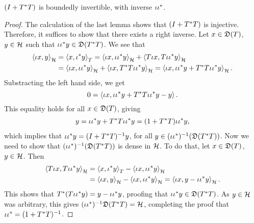 \begin{prop}
 $(I + T ^{*} T)$ is boundedly
 invertible, with inverse $\iota \iota ^{*}$.
\end{prop}
\begin{proof}
  The calculation of the last lemma shows that $(I + T ^{*} T)$ is injective.
  Therefore, it suffices to show that there exists a right inverse.
  Let $x \in \mathfrak{D}(T)$, $y \in \mathcal{H}$ such that 
  $\iota  \iota ^{*} y \in \mathfrak{D}(T^{*} T)$.
  We see that
  \begin{align*}
\left\langle \iota x, y \right\rangle_{\mathcal{H}} &= \left\langle x, \iota ^{*} y \right\rangle_T = 
  \left\langle \iota x,\iota \iota ^{*} y \right\rangle_{\mathcal{H}} +
  \left\langle  T \iota x, T \iota \iota ^{*} y \right\rangle_{\mathcal{H}} \\
  &=\left\langle \iota x, \iota \iota ^{*} y \right\rangle_{\mathcal{H}}  +
  \left\langle \iota x , T ^{*} T \iota \iota ^{*} y \right\rangle_{\mathcal{H}}  =
  \left\langle \iota x, \iota \iota ^{*} y + T^{*} T \iota \iota ^{*} y \right\rangle_{\mathcal{H}} .
  \end{align*}
    Substracting the left hand side, we get
  \[
   0 = \left\langle \iota x , \iota \iota ^{*} y + T^{*} T \iota \iota ^{*} y - y \right\rangle.
  \]
This equality holds for all $x \in \mathfrak{D}(T)$, giving
  \begin{align*}
  y=\iota \iota ^{*} y + T^{*} T \iota \iota ^{*} y 
  = (1+ T ^{*} T) \iota \iota ^{*} y,
  \end{align*}
  which implies that $ \iota \iota ^{*} y= ( I + T ^{*} T) ^{-1} y$, 
  for all $y \in (\iota \iota ^{*} )^{-1} (\mathfrak{D}(T^{*} T))$.
  Now we need to show that $(\iota \iota ^{*} )^{-1} (\mathfrak{D}(T^{*} T))$ is
  dense in $\mathcal{H}$. To do that, let $x\in \mathfrak{D}(T)$, $y \in \mathcal{H}$. Then
  \begin{align*}
   \left\langle T\iota x, T\iota \iota ^{*} y \right\rangle_{\mathcal{H}} &= \left\langle x, \iota ^{*} y \right\rangle_T
 - \left\langle \iota x, \iota \iota ^{*} y \right\rangle_{\mathcal{H}}\\
 &= \left\langle \iota x, y \right\rangle_{\mathcal{H}} - \left\langle \iota x, \iota \iota ^{*} y \right\rangle_{\mathcal{H}} =
 \left\langle \iota x, y - \iota \iota ^{*} y \right\rangle_{\mathcal{H}}.
  \end{align*}
This shows that $T^{*}(T\iota \iota ^{*} y) = y - \iota \iota^{*} y$, proofing
that $\iota \iota ^{*} y \in \mathfrak{D}(T^{*} T)$. As $y\in \mathcal{H}$ was arbitrary, this gives
$(\iota \iota ^{*})^{-1} \mathfrak{D}(T^{*} T) = \mathcal{H}$, completing the proof that 
$\iota \iota ^{*} = (1+ T^{*} T)^{-1}$.
\end{proof}

